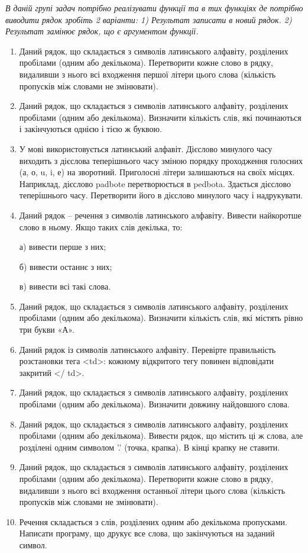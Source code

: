 \documentclass[]{article}
\begin{document}
\emph{
В даній групі задач потрібно
реалізувати функції та в тих функціях де потрібно виводити рядок зробіть
2 варіанти: 1) Результат записати в новий рядок. 2) Результат замінює
рядок, що є аргументом функції.
}

\begin{enumerate}

\item
Даний рядок, що складається з символів латинського алфавіту, розділених
пробілами (одним або декількома). Перетворити кожне слово в рядку,
видаливши з нього всі входження першої літери цього слова (кількість
пропусків між словами не змінювати).
\item
Даний рядок, що складається з символів латинського алфавіту, розділених
пробілами (одним або декількома). Визначити кількість слів, які
починаються і закінчуються однією і тією ж буквою.
\item
У мові використовується латинський алфавіт. Дієслово минулого часу
виходить з дієслова теперішнього часу зміною порядку проходження
голосних (а, о, u, i, е) на зворотний. Приголосні літери залишаються на
своїх місцях. Наприклад, дієслово padbote перетворюється в pedbota.
Здається дієслово теперішнього часу. Перетворити його в дієслово
минулого часу і надрукувати.
\item
Даний рядок -- речення з символів латинського алфавіту. Вивести
найкоротше слово в ньому. Якщо таких слів декілька, то:

а) вивести перше з них;

б) вивести останнє з них;

в) вивести всі такі слова.
\item
Даний рядок, що складається з символів латинського алфавіту, розділених
пробілами (одним або декількома). Визначити кількість слів, які містять
рівно три букви «А».
\item
Даний рядок із символів латинського алфавіту. Перевірте правильність розстановки тега
\textless{}td\textgreater{}: кожному відкритого тегу повинен відповідати
закритий \textless{}/ td\textgreater{}.

\item
Даний рядок, що складається з символів латинського алфавіту, розділених
пробілами (одним або декількома). Визначити довжину найдовшого слова.
\item
Даний рядок, що складається з
символів латинського алфавіту, розділених пробілами (одним або
декількома). Вивести рядок, що містить ці ж слова, але розділені одним
символом '.' (точка, крапка). В кінці крапку не ставити.
\item
Даний рядок, що складається з символів латинського алфавіту, розділених
пробілами (одним або декількома). Перетворити кожне слово в рядку,
видаливши з нього всі входження останньої літери цього слова (кількість
пропусків між словами не змінювати).
\item
Речення складається з слів, розділених одним або декількома пропусками.
Написати програму, що друкує все слова, що закінчуються на заданий
символ.


\end{enumerate}
\end{document}
